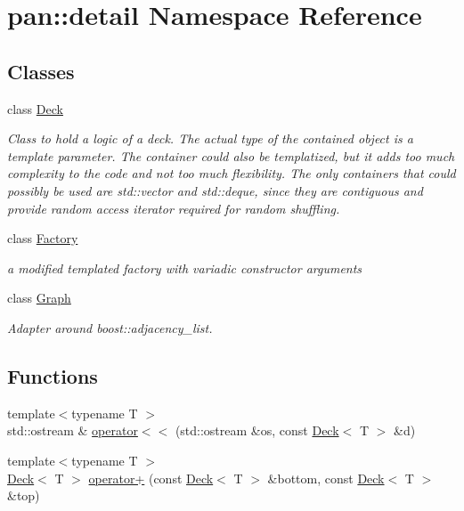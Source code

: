 \hypertarget{namespacepan_1_1detail}{}\section{pan\+:\+:detail Namespace Reference}
\label{namespacepan_1_1detail}
\subsection*{Classes}
\begin{DoxyCompactItemize}
\item 
class \hyperlink{classpan_1_1detail_1_1_deck}{Deck}
\begin{DoxyCompactList}\small\item\em Class to hold a logic of a deck. The actual type of the contained object is a template parameter. The container could also be templatized, but it adds too much complexity to the code and not too much flexibility. The only containers that could possibly be used are std\+::vector and std\+::deque, since they are contiguous and provide random access iterator required for random shuffling. \end{DoxyCompactList}\item 
class \hyperlink{classpan_1_1detail_1_1_factory}{Factory}
\begin{DoxyCompactList}\small\item\em a modified templated factory with variadic constructor arguments \end{DoxyCompactList}\item 
class \hyperlink{classpan_1_1detail_1_1_graph}{Graph}
\begin{DoxyCompactList}\small\item\em Adapter around boost\+::adjacency\+\_\+list. \end{DoxyCompactList}\end{DoxyCompactItemize}
\subsection*{Functions}
\begin{DoxyCompactItemize}
\item 
{\footnotesize template$<$typename T $>$ }\\std\+::ostream \& \hyperlink{namespacepan_1_1detail_a17e20816d23cefffd0e8212ab9070b69}{operator$<$$<$} (std\+::ostream \&os, const \hyperlink{classpan_1_1detail_1_1_deck}{Deck}$<$ T $>$ \&d)
\item 
{\footnotesize template$<$typename T $>$ }\\\hyperlink{classpan_1_1detail_1_1_deck}{Deck}$<$ T $>$ \hyperlink{namespacepan_1_1detail_ac7baf4c74b8184d0b46616e0066b7d14}{operator+} (const \hyperlink{classpan_1_1detail_1_1_deck}{Deck}$<$ T $>$ \&bottom, const \hyperlink{classpan_1_1detail_1_1_deck}{Deck}$<$ T $>$ \&top)
\end{DoxyCompactItemize}


